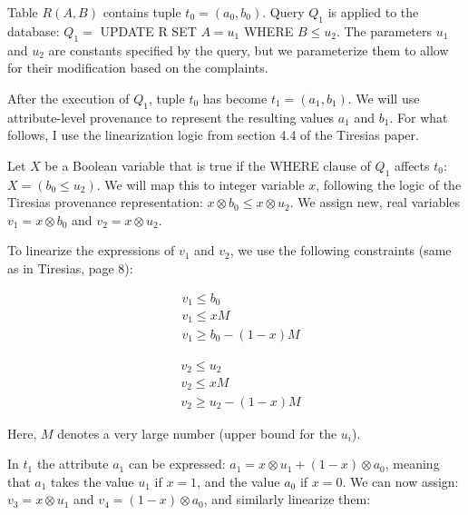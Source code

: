 \documentclass{article}
\begin{document}
Table $R(A,B)$ contains tuple $t_0=(a_0,b_0)$. Query $Q_1$ is applied to the
database: $Q_1 =$ UPDATE R SET $A=u_1$ WHERE $B\leq u_2$. The parameters $u_1$
and $u_2$ are constants specified by the query, but we parameterize them to
allow for their modification based on the complaints.

\smallskip

After the execution of $Q_1$, tuple $t_0$ has become $t_1=(a_1,b_1)$. We will
use attribute-level provenance to represent the resulting values $a_1$ and
$b_1$. For what follows, I use the linearization logic from section 4.4 of the
Tiresias paper.

\smallskip


Let $X$ be a Boolean variable that is true if the WHERE clause of $Q_1$
affects $t_0$: $X=(b_0\leq u_2)$. We will map this to integer variable $x$,
following the logic of the Tiresias provenance representation: $x\otimes
b_0\leq x\otimes u_2$.  We assign new, real variables $v_1= x\otimes
b_0$ and $v_2=x\otimes u_2$.

\smallskip

To linearize the expressions of $v_1$ and $v_2$, we use the following constraints (same as in Tiresias, page 8):

\begin{minipage}{0.7\textwidth}
    \begin{minipage}[t]{0.2\textwidth}
        \begin{align*}
            &v_1\le b_0\\
            &v_1\le xM\\
            &v_1\ge b_0 - (1-x)M
        \end{align*}
    \end{minipage}
    \hspace{4em}
    \begin{minipage}[t]{0.2\textwidth}
        \begin{align*}
            &v_2\le u_2\\
            &v_2\le xM\\
            &v_2\ge u_2 - (1-x)M
        \end{align*}
    \end{minipage}
\end{minipage}

\smallskip

Here, $M$ denotes a very large number (upper bound for the $u_i$).

\smallskip

In $t_1$ the attribute $a_1$ can be expressed: $a_1=x\otimes u_1 +
(1-x)\otimes a_0$, meaning that $a_1$ takes the value $u_1$ if $x=1$, and the
value $a_0$ if $x=0$.  We can now assign: $v_3= x\otimes
u_1$ and $v_4=(1-x)\otimes a_0$, and similarly linearize them:
\end{document}
